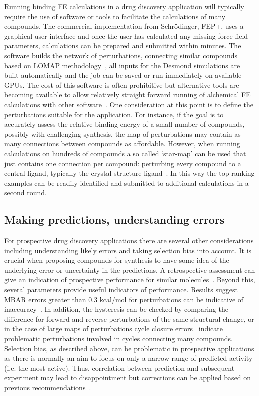 \documentclass[9pt,bestpractices]{livecoms}
\begin{document}
Running binding FE calculations in a drug discovery application will typically require the use of software or tools to facilitate the calculations of many compounds. The commercial implementation from Schr\"{o}dinger, FEP+, uses a graphical user interface and once the user has calculated any missing force field parameters, calculations can be prepared and submitted within minutes. The software builds the network of perturbations, connecting similar compounds based on LOMAP methodology~\cite{liu2013lead}, all inputs for the Desmond simulations are built automatically and the job can be saved or run immediately on available GPUs. The cost of this software is often prohibitive but alternative tools are becoming available to allow relatively straight forward running of alchemical FE calculations with other software~\cite{gapsys2015pmx, loeffler2015fesetup, song2019using, gapsys2020large,  jespers2019qligfep}. One consideration at this point is to define the perturbations suitable for the application. For instance, if the goal is to accurately assess the relative binding energy of a small number of compounds, possibly with challenging synthesis, the map of perturbations may contain as many connections between compounds as affordable. However, when running calculations on hundreds of compounds a so called ‘star-map’ can be used that just contains one connection per compound: perturbing every compound to a central ligand, typically the crystal structure ligand~\cite{konze2019reactionbased}. In this way the top-ranking examples can be readily identified and submitted to additional calculations in a second round. 
%
\subsection{Making predictions, understanding errors}
\label{subsec:predictions}
For prospective drug discovery applications there are several other considerations including understanding likely errors and taking selection bias into account. It is crucial when proposing compounds for synthesis to have some idea of the underlying error or uncertainty in the predictions. A retrospective assessment can give an indication of prospective performance for similar molecules~\cite{ciordia2016application}. Beyond this, several parameters provide useful indicators of performance. Results suggest MBAR errors greater than 0.3 kcal/mol for perturbations can be indicative of inaccuracy~\cite{perez-benito2019predicting}. In addition, the hysteresis can be checked by comparing the difference for forward and reverse perturbations of the same structural change, or in the case of large maps of perturbations cycle closure errors~\cite{wang2013modeling} indicate problematic perturbations involved in cycles connecting many compounds. Selection bias, as described above, can be problematic in prospective applications as there is normally an aim to focus on only a narrow range of predicted activity (i.e. the most active). Thus, correlation between prediction and subsequent experiment may lead to disappointment but corrections can be applied based on previous recommendations~\cite{abel2017critical}. 
\end{document}
